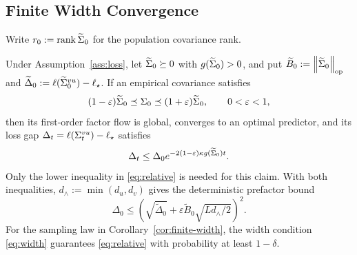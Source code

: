 \subsection{Finite Width Convergence}\label{app:sampling}
Write $r_0:=\operatorname{rank}\widetilde\Sigma_0$ for the population covariance rank.
\begin{theorem}\label{thm:relative}
Under Assumption~\ref{ass:loss}, let $\widetilde\Sigma_0\succeq0$ with
$g(\widetilde\Sigma_0)>0$, and put $\widetilde B_0:=\left\lVert \widetilde\Sigma_0 \right\rVert_{\mathrm{op}}$ and
$\widetilde\Delta_0:=\ell(\widetilde{\Sigma}^{vu}_0)-\ell_\star$.
If an empirical covariance satisfies
\begin{equation}\label{eq:relative}
 (1-\varepsilon)\widetilde\Sigma_0\preceq\Sigma_0
 \preceq(1+\varepsilon)\widetilde\Sigma_0,\qquad 0<\varepsilon<1,
\end{equation}
then its first-order factor flow is global, converges to an optimal
predictor, and its loss gap $\Delta_t=\ell(\Sigma^{vu}_t)-\ell_\star$ satisfies
\begin{equation}\label{eq:sample-rate}
 \Delta_t\le\Delta_0
 e^{-2(1-\varepsilon)\kappa g(\widetilde\Sigma_0)t}.
\end{equation}
Only the lower inequality in \eqref{eq:relative} is needed for this claim.
With both inequalities, $d_\wedge:=\min(d_u,d_v)$ gives the deterministic
prefactor bound
\begin{equation}\label{eq:sample-prefactor}
 \Delta_0\le
 \left(\sqrt{\widetilde\Delta_0}+\varepsilon \widetilde B_0\sqrt{Ld_\wedge/2}\right)^2.
\end{equation}
For the sampling law in Corollary~\ref{cor:finite-width}, the width
condition \eqref{eq:width} guarantees \eqref{eq:relative} with probability
at least $1-\delta$.
\end{theorem}


